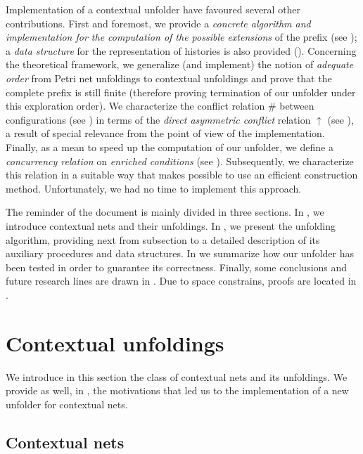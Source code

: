 \documentclass[11pt,a4paper]{article}
\newcommand{\confl}{\ensuremath{\mathord{\#}}}
\begin{document}
Implementation of a contextual unfolder have favoured several other
contributions.  First and foremost, we provide a \emph{concrete algorithm and
implementation for the computation of the possible extensions} of the prefix
(see ); a \emph{data structure} for the
representation of histories is also provided ().
Concerning the theoretical framework, we generalize (and implement) the notion
of \emph{adequate order}  from Petri net unfoldings to contextual
unfoldings and prove that the complete prefix is still finite (therefore
proving termination of our unfolder under this exploration order).  We
characterize the conflict relation $\confl$ between configurations (see
) in terms of the \emph{direct asymmetric conflict} relation
$\uparrow$ (see ), a result of special relevance from
the point of view of the implementation.  Finally, as a mean to speed up the
computation of our unfolder, we define a \emph{concurrency relation} on
\emph{enriched conditions} (see ).  Subsequently, we
characterize this relation in a suitable way that makes possible to use an
efficient construction method.  Unfortunately, we had no time to implement this
approach.

The reminder of the document is mainly divided in three sections.  In
, we introduce contextual nets and their
unfoldings.  In , we present the unfolding algorithm,
providing next from subsection  to
 a detailed description of its auxiliary procedures and
data structures. In  we summarize how our unfolder has
been tested in order to guarantee its correctness.  Finally, some conclusions
and future research lines are drawn in .  Due to space
constrains, proofs are located in .

\section{Contextual unfoldings}
\label{sec:contextual.unfoldings}

We introduce in this section the class of contextual nets and its unfoldings.
We provide as well, in , the motivations that led us
to the implementation of a new unfolder for contextual nets.

\subsection{Contextual nets}
\label{sec:contextual.nets}
\end{document}
